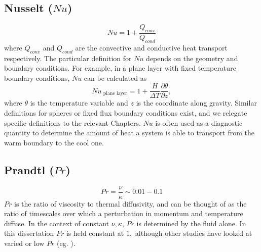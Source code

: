 \subsection*{Nusselt ($Nu$)}
\[Nu = 1+\frac{Q_{conv}}{Q_{cond}}\]
where $Q_{conv}$ and $Q_{cond}$ are the convective and conductive heat transport respectively.
The particular definition for $Nu$ depends on the geometry and boundary conditions. For example, in a plane layer with fixed temperature boundary conditions, $Nu$ can be calculated as 
 \[Nu_{\text{ plane layer}} = 1 + \frac{H}{\Delta T}\frac{\partial \theta}{\partial z}, \]
 where $\theta$ is the temperature variable and $z$ is the coordinate along gravity.
 Similar definitions for spheres or fixed flux boundary conditions exist, and we relegate specific definitions to the relevant Chapters.
$Nu$ is often used as a diagnostic quantity to determine the amount of heat a system is able to transport from the warm boundary to the cool one.
\subsection*{Prandtl ($Pr$)}
\[Pr = \frac{\nu}{\kappa}\sim 0.01-0.1\]
$Pr$ is the ratio of viscosity to thermal diffusivity, and can be thought of as the ratio of timescales over which a perturbation in momentum and temperature diffuse. In the context of constant $\nu,\kappa$,  $Pr$ is determined by the fluid alone. In this dissertation $Pr$ is held constant at $1,$ although other studies have looked at varied or low $Pr$ (eg. \citep{jA01,cG19,sM21}).

